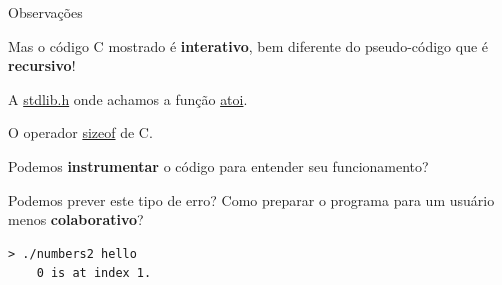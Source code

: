 \documentclass{beamer}
\begin{document}
\begin{frame}{Observações}

  Mas o código C mostrado é \textbf{interativo}, bem diferente do
  pseudo-código que é \textbf{recursivo}!

  A
  \href{https://man7.org/linux/man-pages/man0/stdlib.h.0p.html}{stdlib.h}
  onde achamos a função
  \href{https://man7.org/linux/man-pages/man3/atoi.3p.html}{atoi}.

  O operador \href{https://en.wikipedia.org/wiki/Sizeof}{sizeof} de C.

  Podemos \textbf{instrumentar} o código para entender seu funcionamento?

  \framebreak

  Podemos prever este tipo de erro? Como preparar o programa para um
  usuário menos \textbf{colaborativo}?

  \vspace{1cm}
  
  \begin{lstlisting}[basicstyle=\ttfamily]
    > ./numbers2 hello
    0 is at index 1.
  \end{lstlisting}

\end{frame}
\end{document}
